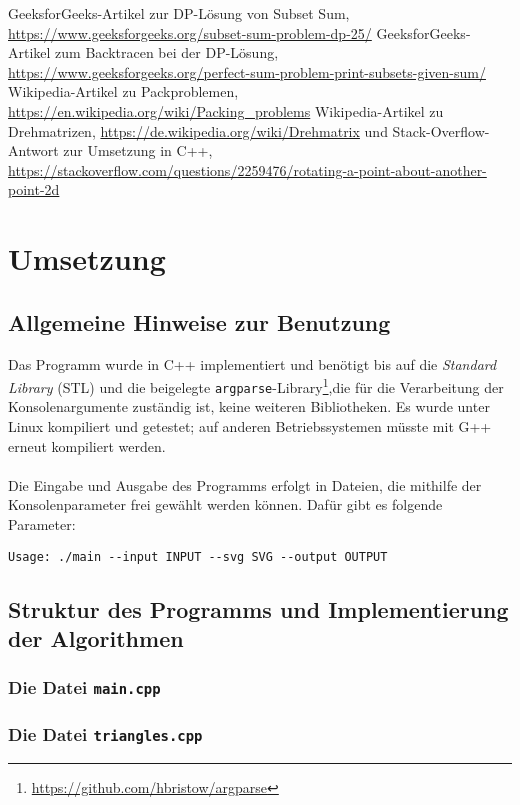 \documentclass[a4paper, notitlepage, 12pt]{scrartcl}
\begin{document}
\begin{thebibliography}{xx}
	 GeeksforGeeks-Artikel zur DP-Lösung von Subset Sum, \url{https://www.geeksforgeeks.org/subset-sum-problem-dp-25/}
	 GeeksforGeeks-Artikel zum Backtracen bei der DP-Lösung, \url{https://www.geeksforgeeks.org/perfect-sum-problem-print-subsets-given-sum/}
	 Wikipedia-Artikel zu Packproblemen, \url{https://en.wikipedia.org/wiki/Packing_problems}
	 Wikipedia-Artikel zu Drehmatrizen, \url{https://de.wikipedia.org/wiki/Drehmatrix} und Stack-Overflow-Antwort zur Umsetzung in C++, \url{https://stackoverflow.com/questions/2259476/rotating-a-point-about-another-point-2d}
\end{thebibliography}
\section{Umsetzung}
\subsection{Allgemeine Hinweise zur Benutzung}
Das Programm wurde in C++ implementiert und benötigt bis auf die \textit{Standard Library} (STL) und die beigelegte \texttt{argparse}-Library\footnote{\url{https://github.com/hbristow/argparse}},die für die Verarbeitung der Konsolenargumente zuständig ist, keine weiteren Bibliotheken. Es wurde unter Linux kompiliert und getestet; auf anderen Betriebssystemen müsste mit G++ erneut kompiliert werden. \\ \\
Die Eingabe und Ausgabe des Programms erfolgt in Dateien, die mithilfe der Konsolenparameter frei gewählt werden können. Dafür gibt es folgende Parameter:
\begin{verbatim}
Usage: ./main --input INPUT --svg SVG --output OUTPUT
\end{verbatim}
\subsection{Struktur des Programms und Implementierung der Algorithmen}
\subsubsection{Die Datei \texttt{main.cpp}}
\subsubsection{Die Datei \texttt{triangles.cpp}}
\end{document}
